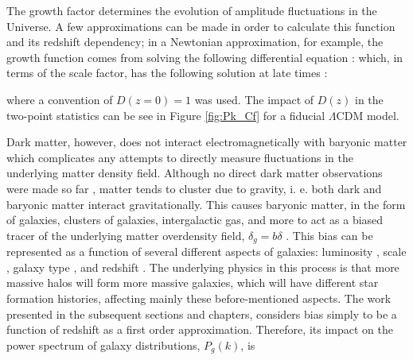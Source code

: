 \qquad The growth factor determines the evolution of amplitude fluctuations in the Universe. A few approximations can be made in order to calculate this function and its redshift dependency; in a Newtonian approximation, for example, the growth function comes from solving the following differential equation \citep{schneider_2016}:
which, in terms of the scale factor, has the following solution at late times \citep{dods,schneider_2016}:

where a convention of $D(z=0)=1$ was used. The impact of $D(z)$ in the two-point statistics can be see in Figure \ref{fig:Pk_Cf} for a fiducial $\Lambda$CDM model.

\qquad Dark matter, however, does not interact electromagnetically with baryonic matter which complicates any attempts to directly measure fluctuations in the underlying matter density field. Although no direct dark matter observations were made so far \citep{2017DarkMatterExpReview}, matter tends to cluster due to gravity, i. e. both dark and baryonic matter interact gravitationally. This causes baryonic matter, in the form of galaxies, clusters of galaxies, intergalactic gas, and more to act as a biased tracer of the underlying matter overdensity field, $\delta_g = b\delta$ \citep{2000-BensonBias,1999Ofer-Bias}. This bias can be represented as a function of several different aspects of galaxies: luminosity \citep{2000-BensonBias,2004PVP,2013Baugh-LumBias}, scale \citep{1999Ofer-Bias,2008ScaleBias,2008Hamann-ScaleBias,2018Simon-ScaleBias}, galaxy type \citep{2008Sanchez-Bias,2016AbramoSeccoLoureiro}, and redshift \citep{1994FKP,1998Heavens-Verde,2000-BensonBias}. The underlying physics in this process is that more massive halos will form more massive galaxies, which will have different star formation histories, affecting mainly these before-mentioned aspects. The work presented in the subsequent sections and chapters, considers bias simply to be a function of redshift as a first order approximation. Therefore, its impact on the power spectrum of galaxy distributions, $P_g(k)$, is 

